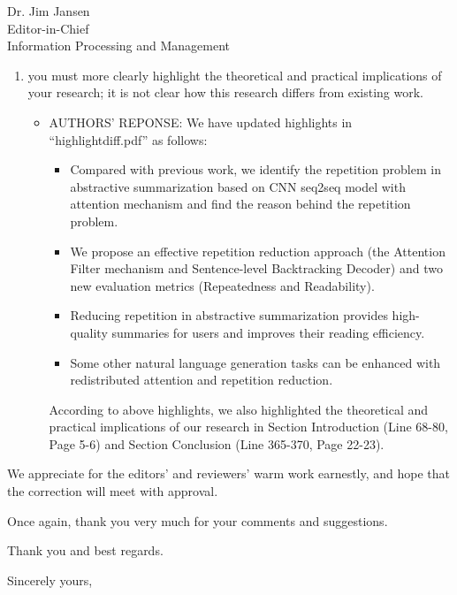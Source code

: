 \documentclass[11pt]{letter} %
\begin{document}
\begin{letter}{Dr. Jim Jansen \\
			Editor-in-Chief  \\
			Information Processing and Management}
\begin{enumerate}
\begin{itemize}
                Previous: ``[5] R. Paulus, C. Xiong, R. Socher, A deep reinforced model for abstractive summarization, CoRR abs/1705.04304.''

                Current: ``[5] R. Paulus, C. Xiong, R. Socher, A deep reinforced model for abstractive summarization, in: 6th International Conference on Learning Representations, ICLR 2018, Vancouver, BC, Canada, April 30 - May 3, 2018, Conference Track Proceedings, 2018''
			\end{itemize}
			\item you must more clearly highlight the theoretical and practical implications of your research; it is not clear how this research differs from existing work.
			\begin{itemize}
				\item[] AUTHORS' REPONSE: We have updated highlights in ``highlightdiff.pdf'' as follows:
                \begin{itemize}
                \item Compared with previous work, we identify the repetition problem in abstractive summarization based on CNN seq2seq model with attention mechanism and find the reason behind the repetition problem.
                \item We propose an effective repetition reduction approach (the Attention Filter mechanism and Sentence-level Backtracking Decoder) and two new evaluation metrics (Repeatedness and Readability). 
                \item Reducing repetition in abstractive summarization provides high-quality summaries for users and improves their reading efficiency.
                \item Some other natural language generation tasks can be enhanced with redistributed attention and repetition reduction.
                \end{itemize}
		        
				According to above highlights, we also highlighted the theoretical and practical implications of our research in Section Introduction (Line 68-80, Page 5-6) and Section Conclusion (Line 365-370, Page 22-23).
			    \end{itemize}
		\end{enumerate}
	
	
		We appreciate for the editors' and reviewers' warm work earnestly,
		and hope that the correction will meet with approval.
		
		Once again, thank you very much for  your comments and suggestions.
		
		
		Thank you and best regards.
		
		\closing{Sincerely yours,}
		
		
		
		
	\end{letter}
	
\end{document}
